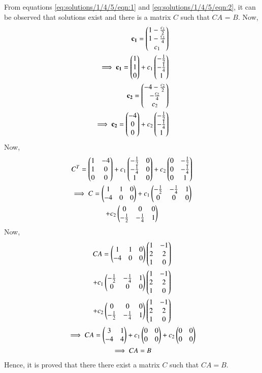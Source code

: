 From equations \ref{eq:solutions/1/4/5/eqn:1} and \ref{eq:solutions/1/4/5/eqn:2}, it can be observed that solutions exist and there is a matrix $C$ such that $CA$ = $B$.
Now,
\begin{align}
\mathbf{c_1} = \begin{pmatrix}1- \frac{c_1}{2}\\1-\frac{c_1}{4}\\c_1\end{pmatrix}\\
\implies \mathbf{c_1} = \begin{pmatrix}1\\1\\0\end{pmatrix} + c_1\begin{pmatrix}-\frac{1}{2}\\-\frac{1}{4}\\1\end{pmatrix}\\
\mathbf{c_2} = \begin{pmatrix}-4- \frac{c_2}{2}\\-\frac{c_2}{4}\\c_2\end{pmatrix}\\
\implies \mathbf{c_2} = \begin{pmatrix}-4\\0\\0\end{pmatrix} + c_2\begin{pmatrix}-\frac{1}{2}\\-\frac{1}{4}\\1\end{pmatrix}
\end{align}
Now,
\begin{multline}
C^T = \begin{pmatrix}1 & -4\\1 & 0\\0 & 0\end{pmatrix}+c_1\begin{pmatrix}-\frac{1}{2} & 0\\-\frac{1}{4} & 0\\1 & 0\end{pmatrix} + c_2\begin{pmatrix}0 & -\frac{1}{2}\\0 & -\frac{1}{4}\\0 & 1\end{pmatrix}\\
\implies C = \begin{pmatrix}1 & 1 & 0\\-4 & 0& 0\end{pmatrix} + c_1 \begin{pmatrix}-\frac{1}{2} & -\frac{1}{4} & 1\\0 & 0 &0\end{pmatrix}\\
+c_2\begin{pmatrix}0 & 0 &0\\-\frac{1}{2} & -\frac{1}{4} & 1\end{pmatrix}
\end{multline}
Now,
\begin{multline}
CA = \begin{pmatrix}1 & 1 & 0\\-4 & 0& 0\end{pmatrix}\begin{pmatrix}1 & -1\\2 & 2\\1 & 0\end{pmatrix}\\
+ c_1 \begin{pmatrix}-\frac{1}{2} & -\frac{1}{4} & 1\\0 & 0 &0\end{pmatrix}\begin{pmatrix}1 & -1\\2 & 2\\1 & 0\end{pmatrix}\\+c_2\begin{pmatrix}0 & 0 &0\\-\frac{1}{2} & -\frac{1}{4} & 1\end{pmatrix}\begin{pmatrix}1 & -1\\2 & 2\\1 & 0\end{pmatrix}\\
\implies CA = \begin{pmatrix}3 & 1\\-4 & 4\end{pmatrix}+c_1\begin{pmatrix}0 & 0\\0 & 0\end{pmatrix}+c_2\begin{pmatrix}0 & 0\\0 & 0\end{pmatrix}\\
\implies CA = B
\end{multline}
Hence, it is proved that there there exist a matrix $C$ such that $CA=B$.




